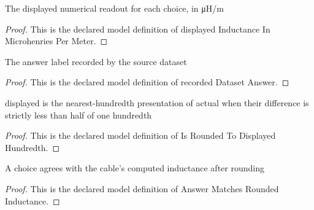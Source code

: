 \begin{definition}
  \label{def:physics:phyx-mini-0885:phyxminiproblems-problemphyxmini0885-answerchoice-displayedinductanceinmicrohenriespermeter}
  The displayed numerical readout for each choice, in μH/m
\end{definition}
\begin{proof}
  This is the declared model definition of displayed Inductance In Microhenries Per Meter.
\end{proof}
\begin{definition}
  \label{def:physics:phyx-mini-0885:phyxminiproblems-problemphyxmini0885-recordeddatasetanswer}
  The answer label recorded by the source dataset
\end{definition}
\begin{proof}
  This is the declared model definition of recorded Dataset Answer.
\end{proof}
\begin{definition}
  \label{def:physics:phyx-mini-0885:phyxminiproblems-problemphyxmini0885-isroundedtodisplayedhundredth}
  displayed is the nearest-hundredth presentation of actual when their difference is strictly less than half of one hundredth
\end{definition}
\begin{proof}
  This is the declared model definition of Is Rounded To Displayed Hundredth.
\end{proof}
\begin{definition}
  \label{def:physics:phyx-mini-0885:phyxminiproblems-problemphyxmini0885-answermatchesroundedinductance}
  A choice agrees with the cable's computed inductance after rounding
\end{definition}
\begin{proof}
  This is the declared model definition of Answer Matches Rounded Inductance.
\end{proof}
